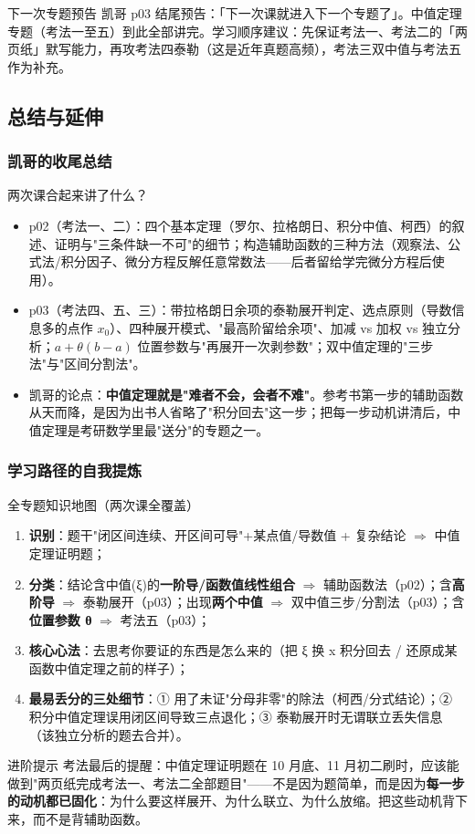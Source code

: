 \documentclass[a4paper]{article}
\begin{document}
\begin{knowledgebox}{下一次专题预告}
凯哥 p03 结尾预告：「下一次课就进入下一个专题了」。中值定理专题（考法一至五）到此全部讲完。学习顺序建议：先保证考法一、考法二的「两页纸」默写能力，再攻考法四泰勒（这是近年真题高频），考法三双中值与考法五作为补充。
\end{knowledgebox}

\subsection{总结与延伸}

\subsubsection{凯哥的收尾总结}

\begin{knowledgebox}{两次课合起来讲了什么？}
\begin{itemize}
\item p02（考法一、二）：四个基本定理（罗尔、拉格朗日、积分中值、柯西）的叙述、证明与"三条件缺一不可"的细节；构造辅助函数的三种方法（观察法、公式法/积分因子、微分方程反解任意常数法——后者留给学完微分方程后使用）。
\item p03（考法四、五、三）：带拉格朗日余项的泰勒展开判定、选点原则（导数信息多的点作 $x_0$）、四种展开模式、"最高阶留给余项"、加减 vs 加权 vs 独立分析；$a+\theta(b-a)$ 位置参数与"再展开一次剥参数"；双中值定理的"三步法"与"区间分割法"。
\item 凯哥的论点：\textbf{中值定理就是"难者不会，会者不难"}。参考书第一步的辅助函数从天而降，是因为出书人省略了"积分回去"这一步；把每一步动机讲清后，中值定理是考研数学里最"送分"的专题之一。
\end{itemize}
\end{knowledgebox}

\subsubsection{学习路径的自我提炼}

\begin{importantbox}{全专题知识地图（两次课全覆盖）}
\begin{enumerate}
\item \textbf{识别}：题干"闭区间连续、开区间可导"+某点值/导数值 + 复杂结论 $\Rightarrow$ 中值定理证明题；
\item \textbf{分类}：结论含中值(ξ)的\textbf{一阶导/函数值线性组合} $\Rightarrow$ 辅助函数法（p02）；含\textbf{高阶导} $\Rightarrow$ 泰勒展开（p03）；出现\textbf{两个中值} $\Rightarrow$ 双中值三步/分割法（p03）；含\textbf{位置参数 θ} $\Rightarrow$ 考法五（p03）；
\item \textbf{核心心法}：去思考你要证的东西是怎么来的（把 ξ 换 x 积分回去 / 还原成某函数中值定理之前的样子）；
\item \textbf{最易丢分的三处细节}：① 用了未证"分母非零"的除法（柯西/分式结论）；② 积分中值定理误用闭区间导致三点退化；③ 泰勒展开时无谓联立丢失信息（该独立分析的题去合并）。
\end{enumerate}
\end{importantbox}

\begin{knowledgebox}{进阶提示}
考法最后的提醒：中值定理证明题在 10 月底、11 月初二刷时，应该能做到"两页纸完成考法一、考法二全部题目"——不是因为题简单，而是因为\textbf{每一步的动机都已固化}：为什么要这样展开、为什么联立、为什么放缩。把这些动机背下来，而不是背辅助函数。
\end{knowledgebox}

\end{document}
